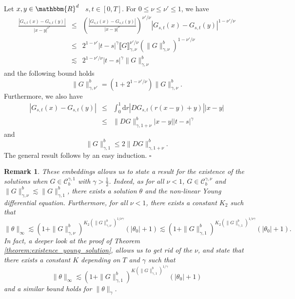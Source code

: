 \documentclass[a4paper,11pt]{article}
\newcommand{\mathd}{\mathrm{d}}
\newtheorem{remark}[theorem]{Remark}
\newenvironment{proof}{{\sc Proof.}}{\hfill$\square$}
\newcommand{\CC}{\mathscr C}
\begin{document}
\begin{proof}
  Let $x,y \in \mathbbm{R}^{d}$ \ $s,t \in [ 0,T ]$. For $0 \leqslant \nu
  \leqslant \nu' \leqslant 1$, we have
  \begin{eqnarray*}
    \frac{| G_{s,t} ( x ) -G_{s,t} ( y ) |}{| x-y |^{\nu'}} & \leqslant &
    \left( \frac{| G_{s,t} ( x ) -G_{s,t} ( y ) |}{| x-y |^{\nu}}
    \right)^{\nu' / \nu} | G_{s,t} ( x ) -G_{s,t} ( y ) |^{1- \nu' / \nu}\\
    & \leqslant & 2^{1- \nu'} | t-s |^{\gamma} \llbracket G
    \rrbracket_{\gamma , \nu}^{\nu' / \nu} ( \| G \|^{b}_{\gamma , \nu} )^{1-
    \nu' / \nu}\\
    & \lesssim & 2^{1- \nu' / \nu} | t-s |^{\gamma} \| G \|_{\gamma ,
    \nu}^{b}
  \end{eqnarray*}
  and the following bound holds
  \[ \| G \|_{\gamma , \nu'}^{b} = ( 1+2^{1- \nu' / \nu} ) \| G \|_{\gamma ,
     \nu}^{b} . \]
  Furthermore, we also have
  \begin{eqnarray*}
    | G_{s,t} ( x ) -G_{s,t} ( y ) | & \leqslant & \int_{0}^{1} \mathd r  | D
    G_{s,t} ( r ( x-y ) +y ) |   | x-y |\\
    & \leqslant & \| D G \|_{\gamma ,1+ \nu}^{b} | x-y | | t-s |^{\gamma}
  \end{eqnarray*}
  and
  \[ \| G \|^{b}_{\gamma ,1} \leqslant 2 \| D G \|_{\gamma ,1+ \nu}^{b} . \]
  The general result follows by an easy induction.
\end{proof}

\begin{remark}
  \label{remark:a_priori_bounds}These embeddings allows us to state a result
  for the existence of the solutions when $G \in \CC^{\gamma ,1}_{b}$ with
  $\gamma > \frac{1}{2}$. Indeed, as for all $\nu <1$, $G \in \CC^{\gamma ,
  \nu}_{b}$ and $\| G \|_{\gamma , \nu}^{b} \lesssim \| G \|^{b}_{\gamma ,1}$,
  there exists a solution $\theta$ and the non-linear Young differential
  equation. Furthermore, for all $\nu <1$, there exists a constant $K_{2}$
  such that
  \[ \| \theta \|_{\infty} \lesssim ( 1+ \| G \|_{\gamma , \nu}^{b} )^{K_{2}
     ( \| G \|^{b}_{\gamma , \nu} )^{1/ \nu \gamma}} ( | \theta_{0} | +1 )  
     \lesssim ( 1+ \| G \|_{\gamma ,1}^{b} )^{K_{2} ( \| G \|^{b}_{\gamma ,1}
     )^{1/ \nu \gamma}} ( | \theta_{0} | +1 ) . \]
  In fact, a deeper look at the proof of Theorem
  \ref{theorem:existence_young_solution}, allows us to get rid of the $\nu$,
  and state that there exists a constant $K$ depending on $T$ and $\gamma$
  such that
  \[ \| \theta \|_{\infty} \lesssim ( 1+ \| G \|_{\gamma ,1}^{b} )^{K ( \| G
     \|^{b}_{\gamma ,1} )^{1/ \gamma}} ( | \theta_{0} | +1 )  \]
  and a similar bound holds for $\| \theta \|_{\gamma}$.
\end{remark}
\end{document}

